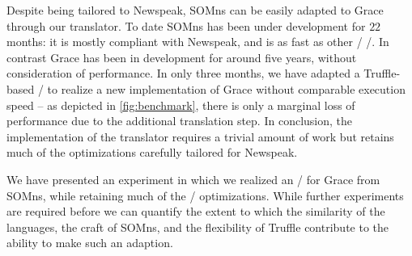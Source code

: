Despite being tailored to Newspeak, SOMns can be easily adapted to Grace through our translator. To date SOMns has been under development for $22$ months: it is mostly compliant with Newspeak, and is as fast as other \JITing/ \VMs/. In contrast Grace has been in development for around five years, without consideration of performance. In only three months, we have adapted a Truffle-based \VM/ to realize a new implementation of Grace without comparable execution speed -- as depicted in \autoref{fig:benchmark}, there is only a marginal loss of performance due to the additional translation step. In conclusion, the implementation of the translator requires a trivial amount of work but retains much of the optimizations carefully tailored for Newspeak.

We have presented an experiment in which we realized an \VM/ for Grace from SOMns, while retaining much of the \AST/ optimizations. While further experiments are required before we can quantify the extent to which the similarity of the languages, the craft of SOMns, and the flexibility of Truffle contribute to the ability to make such an adaption. 


